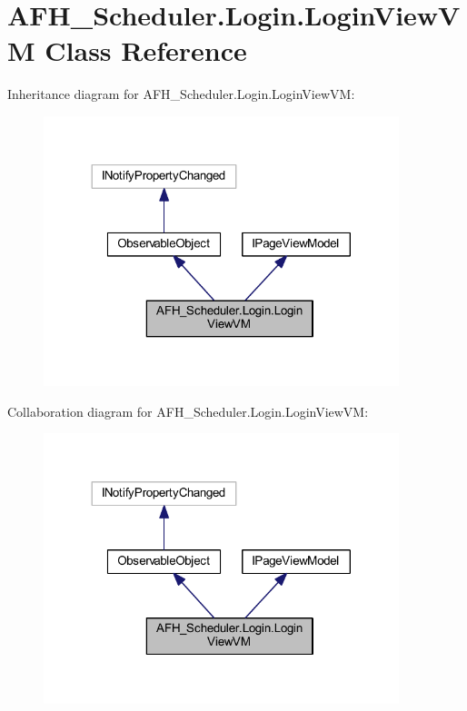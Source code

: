 \section{A\+F\+H\+\_\+\+Scheduler.\+Login.\+Login\+View\+VM Class Reference}
\label{class_a_f_h___scheduler_1_1_login_1_1_login_view_v_m}


Inheritance diagram for A\+F\+H\+\_\+\+Scheduler.\+Login.\+Login\+View\+VM\+:
\nopagebreak
\begin{figure}[H]
\begin{center}
\leavevmode
\includegraphics[width=293pt]{class_a_f_h___scheduler_1_1_login_1_1_login_view_v_m__inherit__graph}
\end{center}
\end{figure}


Collaboration diagram for A\+F\+H\+\_\+\+Scheduler.\+Login.\+Login\+View\+VM\+:
\nopagebreak
\begin{figure}[H]
\begin{center}
\leavevmode
\includegraphics[width=293pt]{class_a_f_h___scheduler_1_1_login_1_1_login_view_v_m__coll__graph}
\end{center}
\end{figure}

